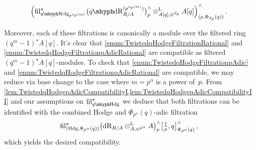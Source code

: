 \documentclass[DIV=12,numbers=enddot,leqno,bibliography=totoc]{scrartcl}
\begin{document}
\begin{numpar}
\begin{alphanumerate}
\begin{equation*}
				\left( \fil_{\qHhodge_{p^{\smash{v_p(m)}}}}^\star \bigl(\qdeRham_{R/A}^{(p^{v_p(m)})}\bigr)_p^\complete\lotimes_{A[q],\psi^{d_p}}A[q]\right)_{(p,\Phi_{d_p}(q))}^\complete\,.
			\end{equation*}
		\end{alphanumerate}
		Moreover, each of these filtrations is canonically a module over the filtered ring $(q^m-1)^\star A[q]$. It's clear that \cref{enum:TwistedqHodgeFiltrationRational} and \cref{enum:TwistedqHodgeFiltrationpAdicRational} are compatible as filtered $(q^m-1)^\star A[q]$-modules. To check that \cref{enum:TwistedqHodgeFiltrationpAdic} and \cref{enum:TwistedqHodgeFiltrationpAdicRational} are compatible, we may reduce via base change to the case where $m=p^\alpha$ is a power of~$p$. From \cref{lem:TwistedqHodgepAdicCompatibilityI,lem:TwistedqHodgepAdicCompatibilityII} and our assumptions on $\fil_{\qHodge}^\star$ we deduce that both filtrations can be identified with the combined Hodge and $\Phi_{p^\alpha}(q)$-adic filtration
		\begin{equation*}
			\operatorname{fil}_{(\mathrm{Hdg},\Phi_{p^\alpha}(q))}^\star \bigl(\mathrm{dR}_{R/A}\otimes^{\mathrm{L}}_{A,\psi^{p^\alpha}}A\bigr)_p^\wedge\bigl[{\textstyle\frac{1}{p}},q\bigr]_{\Phi_{p^\alpha}(q)}^\wedge\,,
		\end{equation*}
		which yields the desired compatibility.
		

\end{numpar}
\end{document}
